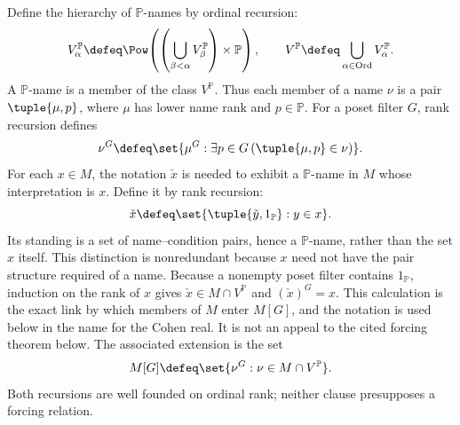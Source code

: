 \begin{definition}
Define the hierarchy of \(\mathbb P\)-names by ordinal recursion:
\[
  V^{\mathbb P}_\alpha
  \defeq
  \Pow\!\left(
    \left(\bigcup_{\beta<\alpha}V^{\mathbb P}_\beta\right)
    \times\mathbb P
  \right),
  \qquad
  V^{\mathbb P}\defeq
  \bigcup_{\alpha\in\operatorname{Ord}}V^{\mathbb P}_\alpha.
\]
A \(\mathbb P\)-name is a member of the class \(V^{\mathbb P}\).  Thus each
member of a name \(\nu\) is a pair \(\tuple{\mu,p}\), where \(\mu\) has lower
name rank and \(p\in\mathbb P\).  For a poset filter \(G\), rank recursion
defines
\[
  \nu^G
  \defeq
  \set{\mu^G:
        \exists p\in G\,(\tuple{\mu,p}\in\nu)}.
\]
For each \(x\in M\), the notation \(\check x\) is needed to exhibit a
\(\mathbb P\)-name in \(M\) whose interpretation is \(x\).  Define it by rank
recursion:
\[
  \check x\defeq
  \set{\tuple{\check y,1_{\mathbb P}}:y\in x}.
\]
Its standing is a set of name--condition pairs, hence a
\(\mathbb P\)-name, rather than the set \(x\) itself.  This distinction
is nonredundant because \(x\) need not have the pair structure required of a
name.  Because a nonempty poset filter contains \(1_{\mathbb P}\), induction on
the rank of \(x\) gives
\(\check x\in M\cap V^{\mathbb P}\) and \((\check x)^G=x\).  This calculation
is the exact link by which members of \(M\) enter \(M[G]\), and the
notation is used below in the name for the Cohen real.  It is not an appeal
to the cited forcing theorem below.
The associated extension is the set
\[
  M[G]
  \defeq
  \set{\nu^G:\nu\in M\cap V^{\mathbb P}}.
\]
Both recursions are well founded on ordinal rank; neither clause presupposes a
forcing relation.
\end{definition}

